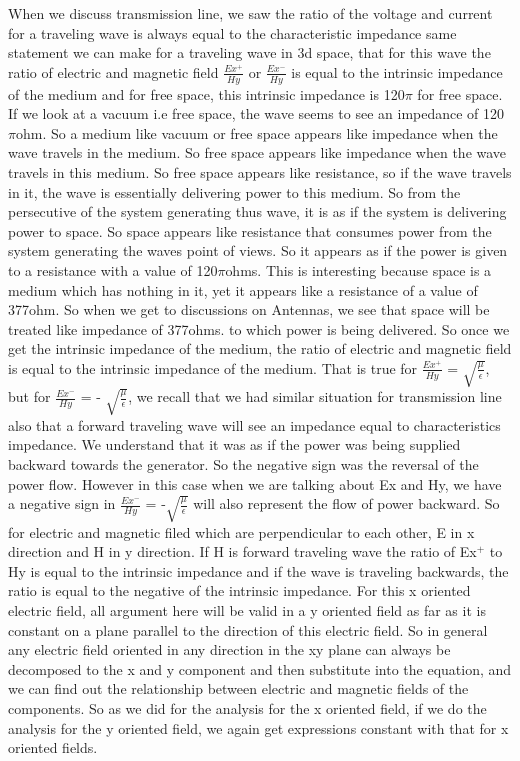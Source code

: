 			When we discuss transmission line, we saw the ratio of the voltage and current for a traveling wave is always equal to the characteristic impedance same statement we can make for a traveling wave in 3d space, that for this wave the ratio of electric and magnetic field $\frac{Ex^{+}}{Hy}$ or $\frac{Ex^{-}}{Hy}$ is equal to the intrinsic impedance of the medium and for free space, this intrinsic impedance is 120$\pi$ for free space. If we look at a vacuum i.e free space, the wave seems to see an impedance of 120$\pi$ohm. So a medium like vacuum or free space appears like impedance when the wave travels in the medium. So free space appears like impedance when the wave travels in this medium. So free space appears like resistance, so if the wave travels in it, the wave is essentially delivering power to this medium. So from the persecutive of the system generating thus wave, it is as if the system is delivering power to space. So space appears like resistance that consumes power from the system generating the waves point of views. So it appears as if the power is given to a resistance with a value of 120$\pi$ohms. This is interesting because space is a medium which has nothing in it, yet it appears like a resistance of a value of 377ohm. So when we get to discussions on Antennas, we see that space will be treated like impedance of 377ohms. to which power is being delivered. So once we get the intrinsic impedance of the medium, the ratio of electric and magnetic field is equal to the intrinsic impedance of the medium. That is  true for $\frac{Ex^+}{Hy}$ = $\sqrt{\frac{\mu}{\epsilon}}$, but for $\frac{Ex^-}{Hy}$ = - $\sqrt{\frac{\mu}{\epsilon}}$, we recall that we had similar situation for transmission line also that a forward traveling wave will see an impedance equal to characteristics impedance. We understand that it was as if the power was being supplied backward towards the generator. So the negative sign was the reversal of the power flow. However in this case when we are talking about Ex and Hy, we have a negative sign in $\frac{Ex^-}{Hy}$ = -$\sqrt{\frac{\mu}{\epsilon}}$ will also represent the flow of power backward. So for electric and magnetic filed which are perpendicular to each other, E in x direction and H in y direction. If H is forward traveling wave the ratio of Ex$^+$ to Hy is equal to the intrinsic impedance and if the wave is traveling backwards, the ratio is equal to the negative of the intrinsic impedance. For this x oriented electric field, all argument here will be valid in a y oriented field as far as it is constant on a plane parallel  to the direction of this electric field. So in general any electric field oriented in any direction in the xy plane can always be decomposed to the x and y component and then substitute into the equation, and we can find out the relationship between electric and magnetic fields of the components. So as we did for the analysis for the x oriented field, if we do the analysis for the y oriented field, we again get expressions constant with that for x oriented fields.\\
			
